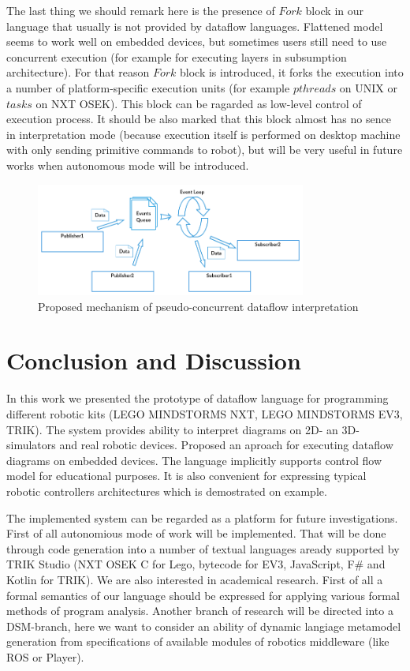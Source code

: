 \documentclass[conference,compsoc]{IEEEtran}
\begin{document}
The last thing we should remark here is the presence of $Fork$ block in our language that usually is not provided by dataflow languages. Flattened model seems to work well on embedded devices, but sometimes users still need to use concurrent execution (for example for executing layers in subsumption architecture). For that reason $Fork$ block is introduced, it forks the execution into a number of platform-specific execution units (for example $pthreads$ on UNIX or $tasks$ on NXT OSEK). This block can be ragarded as low-level control of execution process. It should be also marked that this block almost has no sence in interpretation mode (because execution itself is performed on desktop machine with only sending primitive commands to robot), but will be very useful in future works when autonomous mode will be introduced.

\begin{figure}[ht]
	\centering
	\includegraphics[width=3.5in]{Interaction.png}
	\caption{Proposed mechanism of pseudo-concurrent dataflow interpretation}
	\label{image:interpreter-interaction}
\end{figure}


\section{Conclusion and Discussion}
\label{sec:Conclusion}
In this work we presented the prototype of dataflow language for programming different robotic kits (LEGO MINDSTORMS NXT, LEGO MINDSTORMS EV3, TRIK). The system provides ability to interpret diagrams on 2D- an 3D-simulators and real robotic devices. Proposed an aproach for executing dataflow diagrams on embedded devices. The language implicitly supports control flow model for educational purposes. It is also convenient for expressing typical robotic controllers architectures which is demostrated on example.

The implemented system can be regarded as a platform for future investigations. First of all autonomious mode of work will be implemented. That will be done through code generation into a number of textual languages aready supported by TRIK Studio (NXT OSEK C for Lego, bytecode for EV3, JavaScript, F\#\cite{kirsanov2014robotics} and Kotlin for TRIK). We are also interested in academical research. First of all a formal semantics of our language should be expressed for applying various formal methods of program analysis. Another branch of research will be directed into a DSM-branch, here we want to consider an ability of dynamic langiage metamodel generation from specifications of available modules of robotics middleware (like ROS\cite{quigley2009ros} or Player\cite{gerkey2003player}).

\newpage


\end{document}
